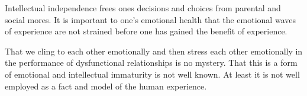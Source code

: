 

Intellectual independence frees ones decisions and choices from
parental and social mores.  It is important to one's emotional health
that the emotional waves of experience are not strained before one has
gained the benefit of experience.  

That we cling to each other emotionally and then stress each other
emotionally in the performance of dysfunctional relationships is no
mystery.  That this is a form of emotional and intellectual immaturity
is not well known.  At least it is not well employed as a fact and
model of the human experience.


\bye
